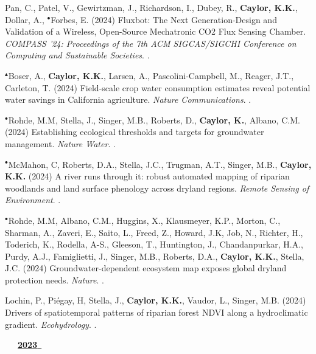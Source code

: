 \begin{etaremune}
\item Pan, C., Patel, V., Gewirtzman, J., Richardson, I., Dubey, R., \textbf{ Caylor, K.K.}, Dollar, A., $^{\bullet}$Forbes, E. (2024) Fluxbot: The Next Generation-Design and Validation of a Wireless, Open-Source Mechatronic CO2 Flux Sensing Chamber. \emph{COMPASS '24: Proceedings of the 7th ACM SIGCAS/SIGCHI Conference on Computing and Sustainable Societies}. .
\item $^{\blacktriangle}$Boser, A., \textbf{ Caylor, K.K.}, Larsen, A., Pascolini-Campbell, M., Reager, J.T., Carleton, T. (2024) Field-scale crop water consumption estimates reveal potential water savings in California agriculture. \emph{Nature Communications}. .
\item $^{\bullet}$Rohde, M.M, Stella, J., Singer, M.B., Roberts, D., \textbf{ Caylor, K.}, Albano, C.M. (2024) Establishing ecological thresholds and targets for groundwater management. \emph{Nature Water}. .
\item $^{\bullet}$McMahon, C, Roberts, D.A., Stella, J.C., Trugman, A.T., Singer, M.B., \textbf{ Caylor, K.K.} (2024) A river runs through it: robust automated mapping of riparian woodlands and land surface phenology across dryland regions. \emph{Remote Sensing of Environment}. .
\item $^{\bullet}$Rohde, M.M, Albano, C.M., Huggins, X., Klausmeyer, K.P., Morton, C., Sharman, A., Zaveri, E., Saito, L., Freed, Z., Howard, J.K, Job, N., Richter, H., Toderich, K., Rodella, A-S., Gleeson, T., Huntington, J., Chandanpurkar, H.A., Purdy, A.J., Famiglietti, J., Singer, M.B., Roberts, D.A., \textbf{ Caylor, K.K.}, Stella, J.C. (2024) Groundwater-dependent ecosystem map exposes global dryland protection needs. \emph{Nature}. .
\item Lochin, P., Pi\'egay, H, Stella, J., \textbf{ Caylor, K.K.}, Vaudor, L., Singer, M.B. (2024) Drivers of spatiotemporal patterns of riparian forest NDVI along a hydroclimatic gradient. \emph{Ecohydrology}. .

\vspace{0.1in}
\mbox{\ \ \ \underline{\textbf{2023 }}}
\vspace{0.1in}


\end{etaremune}
